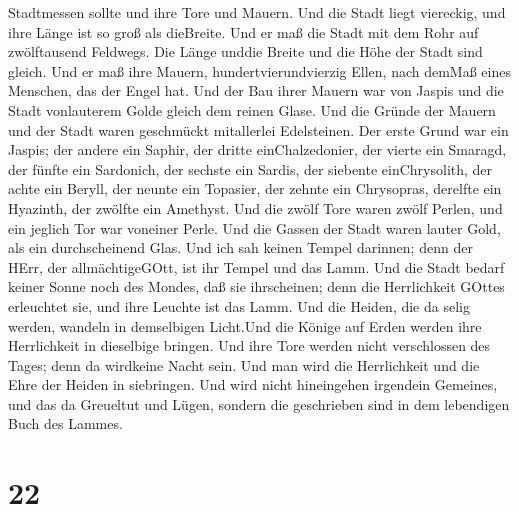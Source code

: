 Stadtmessen sollte und ihre Tore und Mauern.  Und die Stadt
liegt viereckig, und ihre Länge ist so groß als dieBreite. Und er maß
die Stadt mit dem Rohr auf zwölftausend Feldwegs. Die Länge unddie
Breite und die Höhe der Stadt sind gleich.  Und er maß ihre
Mauern, hundertvierundvierzig Ellen, nach demMaß eines Menschen, das der
Engel hat.  Und der Bau ihrer Mauern war von Jaspis und die
Stadt vonlauterem Golde gleich dem reinen Glase.  Und die
Gründe der Mauern und der Stadt waren geschmückt mitallerlei
Edelsteinen. Der erste Grund war ein Jaspis; der andere ein Saphir, der
dritte einChalzedonier, der vierte ein Smaragd,  der fünfte
ein Sardonich, der sechste ein Sardis, der siebente einChrysolith, der
achte ein Beryll, der neunte ein Topasier, der zehnte ein Chrysopras,
derelfte ein Hyazinth, der zwölfte ein Amethyst.  Und die
zwölf Tore waren zwölf Perlen, und ein jeglich Tor war voneiner Perle.
Und die Gassen der Stadt waren lauter Gold, als ein durchscheinend Glas.
 Und ich sah keinen Tempel darinnen; denn der HErr, der
allmächtigeGOtt, ist ihr Tempel und das Lamm.  Und die
Stadt bedarf keiner Sonne noch des Mondes, daß sie ihrscheinen; denn die
Herrlichkeit GOttes erleuchtet sie, und ihre Leuchte ist das Lamm.
 Und die Heiden, die da selig werden, wandeln in
demselbigen Licht.Und die Könige auf Erden werden ihre Herrlichkeit in
dieselbige bringen.  Und ihre Tore werden nicht
verschlossen des Tages; denn da wirdkeine Nacht sein.  Und
man wird die Herrlichkeit und die Ehre der Heiden in siebringen.
 Und wird nicht hineingehen irgendein Gemeines, und das da
Greueltut und Lügen, sondern die geschrieben sind in dem lebendigen Buch
des Lammes.

\hypertarget{section-20}{%
\section{22}\label{section-20}}

